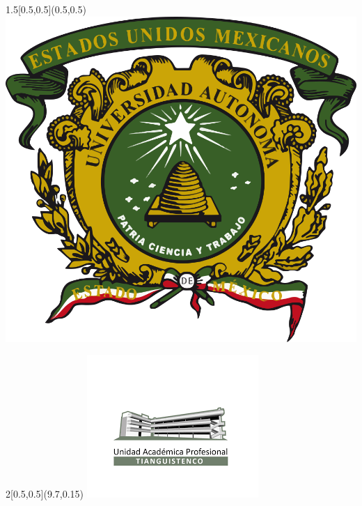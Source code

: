 \begin{titlepage}
	\BgThispage
	\begin{textblock}{1.5}[0.5,0.5](0.5,0.5)
		\includegraphics[width=\linewidth]{../images/uaemexlogo.png}\\[3.5cm]
	\end{textblock}
	
	\begin{textblock}{2}[0.5,0.5](9.7,0.15)
		\includegraphics[width=\linewidth]{../images/images.png}\\[2cm]
	\end{textblock}
	

\end{titlepage}
